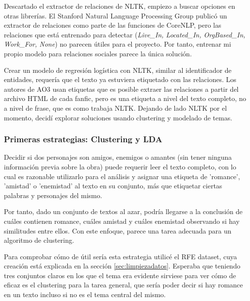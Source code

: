 \documentclass{pre-tfg}
\begin{document}
Descartado el extractor de relaciones de NLTK, empiezo a buscar opciones en otras librerías. El Stanford Natural Language Processing Group publicó un extractor de relaciones como parte de las funciones de CoreNLP, pero las relaciones que está entrenado para detectar (\textit{Live\_In, Located\_In, OrgBased\_In, Work\_For, None}) no parecen útiles para el proyecto. Por tanto, entrenar mi propio modelo para relaciones sociales parece la única solución.

Crear un modelo de regresión logística con NLTK, similar al identificador de entidades, requería que el texto ya estuviera etiquetado con las relaciones. Los autores de AO3 usan etiquetas que es posible extraer las relaciones a partir del archivo HTML de cada fanfic, pero es una etiqueta a nivel del texto completo, no a nivel de frase, que es como trabaja NLTK. Dejando de lado NLTK por el momento, decidí explorar soluciones usando clustering y modelado de temas.

\subsubsection{Primeras estrategias: Clustering y LDA}
\label{sec:relextract}
Decidir si dos personajes son amigos, enemigos o amantes (sin tener ninguna información previa sobre la obra) puede requerir leer el texto completo, con lo cual es razonable utilizarlo para el análisis y asignar una etiqueta de 'romance', 'amistad' o 'enemistad' al texto en su conjunto, más que etiquetar ciertas palabras y personajes del mismo.

Por tanto, dado un conjunto de textos al azar, podría llegarse a la conclusión de cuáles contienen romance, cuáles amistad y cuáles enemistad observando si hay similitudes entre ellos. Con este enfoque, parece una tarea adecuada para un algoritmo de clustering.

Para comprobar cómo de útil sería esta estrategia utilicé el RFE dataset, cuya creación está explicada en la sección \ref{sec:limpiezadatos}. Esperaba que teniendo tres conjuntos claros en los que el tema era evidente sirviese para ver cómo de eficaz es el clustering para la tarea general, que sería poder decir si hay romance en un texto incluso si no es el tema central del mismo.
\end{document}
